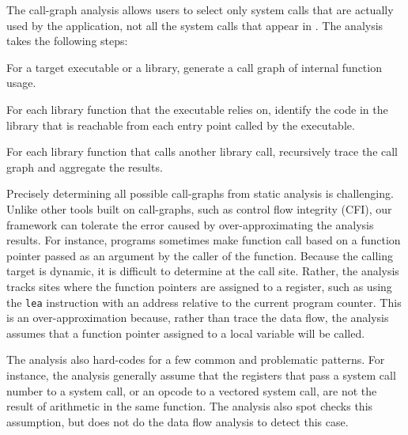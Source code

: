 The call-graph analysis allows users to select only system calls that are actually used by the application, not all the system calls that appear in \libc{}.
The analysis takes the following steps:
\begin{compactitem}
\item For a target executable or a library, generate a call graph of internal function usage.
\item For each library function that the executable relies on, identify the code in the library that is reachable from each entry point called by the executable.
\item For each library function that calls another library call, recursively trace the call graph and aggregate the results. 
\end{compactitem}


Precisely determining all possible call-graphs from static analysis is challenging.
Unlike other tools built on 
call-graphs, such as control flow integrity (CFI), our framework can tolerate the error caused by over-approximating the analysis results.
For instance, 
programs sometimes make function call based on a function pointer passed as an argument by the caller of the function. 
Because the calling target is dynamic, it is difficult to determine at the  call site.
Rather, the analysis tracks sites where the function pointers are assigned to a register, such as using the {\tt lea} instruction with an address
relative to the current program counter.
This is an over-approximation because, rather than trace the data flow, the analysis assumes that a function pointer assigned to a local variable will be called.

The analysis also hard-codes for a few common and problematic patterns.
For instance, the analysis generally assume that the registers that pass a system call number to a system call,
or an opcode to a vectored system call, are not the result of arithmetic in the same function.
The analysis also spot checks this assumption, but does not do the data flow analysis to detect this case.

